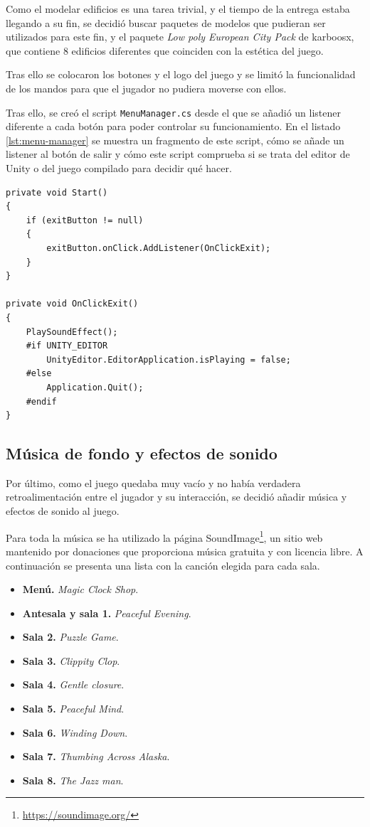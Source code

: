 Como el modelar edificios es una tarea trivial, y el tiempo de la entrega estaba llegando a su fin, se decidió buscar paquetes de modelos que pudieran ser utilizados para este fin, y el paquete \textit{Low poly European City Pack} de karboosx, que contiene 8 edificios diferentes que coinciden con la estética del juego.

Tras ello se colocaron los botones y el logo del juego y se limitó la funcionalidad de los mandos para que el jugador no pudiera moverse con ellos. 

Tras ello, se creó el script \texttt{MenuManager.cs} desde el que se añadió un listener diferente a cada botón para poder controlar su funcionamiento. En el listado \ref{lst:menu-manager} se muestra un fragmento de este script, cómo se añade un listener al botón de salir y cómo este script comprueba si se trata del editor de Unity o del juego compilado para decidir qué hacer.

\begin{lstlisting}[caption=Fragmento del script gestionar el menú, label=lst:menu-manager]
private void Start()
{
    if (exitButton != null)
    {
        exitButton.onClick.AddListener(OnClickExit);
    }
}

private void OnClickExit()
{
    PlaySoundEffect();
    #if UNITY_EDITOR
        UnityEditor.EditorApplication.isPlaying = false;
    #else
        Application.Quit();
    #endif
}
\end{lstlisting}

\subsection{Música de fondo y efectos de sonido}

Por último, como el juego quedaba muy vacío y no había verdadera retroalimentación entre el jugador y su interacción, se decidió añadir música y efectos de sonido al juego.

Para toda la música se ha utilizado la página SoundImage\footnote{\url{https://soundimage.org/}}, un sitio web mantenido por donaciones que proporciona música gratuita y con licencia libre. A continuación se presenta una lista con la canción elegida para cada sala.

\begin{itemize}
    \item \textbf{Menú.} \textit{Magic Clock Shop}.
    \item \textbf{Antesala y sala 1.} \textit{Peaceful Evening}.
    \item \textbf{Sala 2.} \textit{Puzzle Game}.
    \item \textbf{Sala 3.} \textit{Clippity Clop}.
    \item \textbf{Sala 4.} \textit{Gentle closure}.
    \item \textbf{Sala 5.} \textit{Peaceful Mind}.
    \item \textbf{Sala 6.} \textit{Winding Down}.
    \item \textbf{Sala 7.} \textit{Thumbing Across Alaska}.
    \item \textbf{Sala 8.} \textit{The Jazz man}.
\end{itemize}

